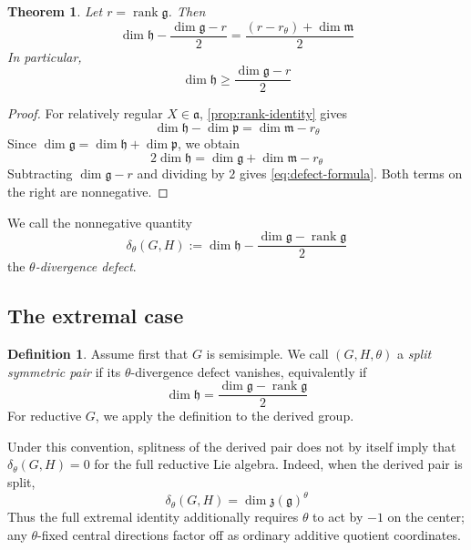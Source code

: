 \documentclass[11pt]{amsart}
\newtheorem{theorem}{Theorem}[section]
\theoremstyle{definition}
\newtheorem{definition}[definition]{Definition}
\theoremstyle{remark}
\newcommand{\rank}{\operatorname{rank}}
\newcommand{\g}{\mathfrak g}
\newcommand{\h}{\mathfrak h}
\newcommand{\p}{\mathfrak p}
\newcommand{\aA}{\mathfrak a}
\newcommand{\mM}{\mathfrak m}
\begin{document}
\begin{theorem}\label{thm:defect-formula}
Let $r=\rank\g$.  Then
\begin{equation}\label{eq:defect-formula}
 \dim\h-\frac{\dim\g-r}{2}
 =\frac{(r-r_\theta)+\dim\mM}{2}
\end{equation}
In particular,
\begin{equation}\label{eq:dimension-lower-bound}
 \dim\h\geq\frac{\dim\g-r}{2}
\end{equation}
\end{theorem}

\begin{proof}
For relatively regular $X\in\aA$, \cref{prop:rank-identity} gives
\[
 \dim\h-\dim\p=\dim\mM-r_\theta
\]
Since $\dim\g=\dim\h+\dim\p$, we obtain
\[
 2\dim\h=\dim\g+\dim\mM-r_\theta
\]
Subtracting $\dim\g-r$ and dividing by $2$ gives
\eqref{eq:defect-formula}.  Both terms on the right are nonnegative.
\end{proof}

We call the nonnegative quantity
\begin{equation}\label{eq:theta-divergence-defect}
 \delta_\theta(G,H)
 :=\dim\h-\frac{\dim\g-\rank\g}{2}
\end{equation}
the \emph{$\theta$-divergence defect}.

\subsection{The extremal case}

\begin{definition}\label{def:split-symmetric}
Assume first that $G$ is semisimple.  We call $(G,H,\theta)$ a
\emph{split symmetric pair} if its $\theta$-divergence defect vanishes,
equivalently if
\begin{equation}\label{eq:extremal-case}
 \dim\h=\frac{\dim\g-\rank\g}{2}
\end{equation}
For reductive $G$, we apply the definition to the derived group.
\end{definition}

Under this convention, splitness of the derived pair does not by itself imply
that $\delta_\theta(G,H)=0$ for the full reductive Lie algebra.  Indeed, when
the derived pair is split,
\[
 \delta_\theta(G,H)=\dim\mathfrak z(\g)^\theta
\]
Thus the full extremal identity additionally requires $\theta$ to act by
$-1$ on the center; any $\theta$-fixed central directions factor off as
ordinary additive quotient coordinates.
\end{document}
